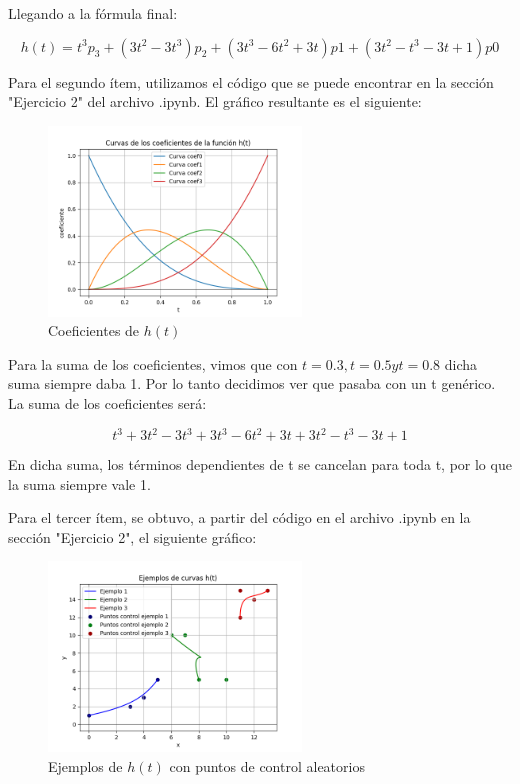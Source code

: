 \documentclass{article}
\begin{document}
Llegando a la fórmula final:

$$
h(t) = t^3p_3 + (3t^2-3t^3)p_2 + (3t^3-6t^2+3t)p1 + (3t^2-t^3-3t+1)p0
$$

Para el segundo ítem, utilizamos el código que se puede encontrar en la sección "Ejercicio 2" del archivo .ipynb. El gráfico resultante es el siguiente:

\begin{figure}[H]
    \centering
    \includegraphics[width=0.6\textwidth]{imagenes/graf_2a.png}
    \caption{Coeficientes de $h(t)$}
    \label{fig:ejemplo}
\end{figure}

Para la suma de los coeficientes, vimos que con $t=0.3, t=0.5 y t=0.8$ dicha suma siempre daba 1. Por lo tanto decidimos ver que pasaba con un t genérico. La suma de los coeficientes será:

$$
t^3 + 3t^2-3t^3 + 3t^3-6t^2+3t +3t^2-t^3-3t+1
$$

En dicha suma, los términos dependientes de t se cancelan para toda t, por lo que la suma siempre vale 1.

Para el tercer ítem, se obtuvo, a partir del código en el archivo .ipynb en la sección "Ejercicio 2", el siguiente gráfico:

\begin{figure}[H]
    \centering
    \includegraphics[width=0.6\textwidth]{imagenes/graf_2c.png}
    \caption{Ejemplos de $h(t)$ con puntos de control aleatorios}
    \label{fig:ejemplo}
\end{figure}
\end{document}
